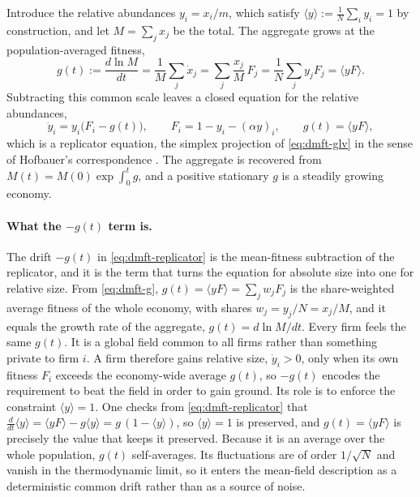Introduce the relative abundances $y_i = x_i/m$, which satisfy $\langle y\rangle :=
\frac1N\sum_i y_i = 1$ by construction, and let $M = \sum_j x_j$ be the total. The
aggregate grows at the population-averaged fitness,
\begin{equation}
    g(t) := \frac{d\ln M}{dt}
          = \frac1M\sum_j \dot x_j = \sum_j \frac{x_j}{M}\,F_j
          = \frac1N\sum_j y_j F_j = \langle yF\rangle .
    \label{eq:dmft-g}
\end{equation}
Subtracting this common scale leaves a closed equation for the relative abundances,
\begin{equation}
    \dot y_i = y_i\big(F_i - g(t)\big),\qquad
    F_i = 1 - y_i - (\alpha y)_i,\qquad
    g(t) = \langle yF\rangle ,
    \label{eq:dmft-replicator}
\end{equation}
which is a replicator equation, the simplex projection of \eqref{eq:dmft-glv} in the sense
of Hofbauer's correspondence \citep{hofbauer81}. The aggregate is recovered from
$M(t) = M(0)\exp\!\int_0^t g$, and a positive stationary $g$ is a steadily growing
economy.

\paragraph{What the $-g(t)$ term is.}
The drift $-g(t)$ in \eqref{eq:dmft-replicator} is the mean-fitness subtraction of the
replicator, and it is the term that turns the equation for absolute size into one for
relative size. From \eqref{eq:dmft-g}, $g(t) = \langle yF\rangle = \sum_j w_j F_j$ is the
share-weighted average fitness of the whole economy, with shares $w_j = y_j/N = x_j/M$,
and it equals the growth rate of the aggregate, $g(t) = d\ln M/dt$. Every firm feels the
same $g(t)$. It is a global field common to all firms rather than something private to firm $i$. A firm therefore
gains relative size, $\dot y_i > 0$, only when its own fitness $F_i$ exceeds the
economy-wide average $g(t)$, so $-g(t)$ encodes the requirement to beat the field in
order to gain ground. Its role is to enforce the constraint $\langle y\rangle = 1$. One
checks from \eqref{eq:dmft-replicator} that $\frac{d}{dt}\langle y\rangle = \langle
yF\rangle - g\langle y\rangle = g\,(1 - \langle y\rangle)$, so $\langle y\rangle = 1$ is
preserved, and $g(t) = \langle yF\rangle$ is precisely the value that keeps it preserved.
Because it is an average over the whole population, $g(t)$ self-averages. Its fluctuations
are of order $1/\sqrt N$ and vanish in the thermodynamic limit, so it enters the mean-field
description as a deterministic common drift rather than as a source of noise.


